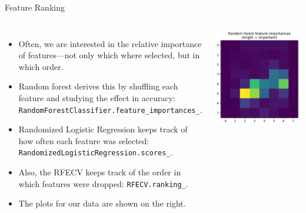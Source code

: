 \documentclass[10pt, aspectratio=169]{beamer} %
\begin{document}
\begin{frame}[fragile]{Feature Ranking}
\begin{columns}
\begin{itemize}
	\item Often, we are interested in the relative importance of features---not only which where selected, but in which order.
	\item Random forest derives this by shuffling each feature and studying the effect in accuracy: \verb+RandomForestClassifier.feature_importances_+.
	\item Randomized Logistic Regression keeps track of how often each feature was selected: \verb+RandomizedLogisticRegression.scores_+.
	\item Also, the RFECV keeps track of the order in which features were dropped: \verb+RFECV.ranking_+.
	\item The plots for our data are shown on the right.
\end{itemize}
\begin{center}
\includegraphics[width=\columnwidth]{RF_ranking.pdf}\\

\end{center}
\end{columns}
\end{frame}
\end{document}
